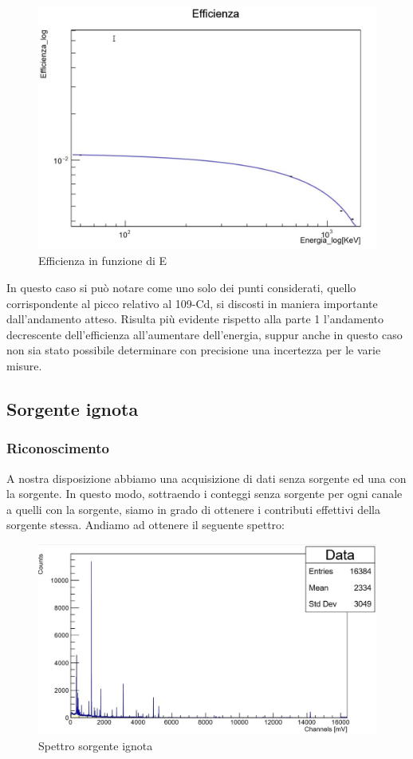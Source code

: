 \documentclass[a4paper,10pt]{article}
\begin{document}
\begin{figure}[H]
    \centering
    \includegraphics[scale=0.45]{grafici/efficienzamultigamma}
    \caption{Efficienza in funzione di E}
\end{figure}

In questo caso si può notare come uno solo dei punti considerati, quello corrispondente al picco relativo al 109-Cd, si discosti in maniera importante dall'andamento atteso. Risulta più evidente rispetto alla parte 1 l'andamento decrescente dell'efficienza all'aumentare dell'energia, suppur anche in questo caso non sia stato possibile determinare con precisione una incertezza per le varie misure.

\subsection{Sorgente ignota}
\subsubsection{Riconoscimento}
A nostra disposizione abbiamo una acquisizione di dati senza sorgente ed una con la sorgente. In questo modo, sottraendo i conteggi senza sorgente per ogni canale a quelli con la sorgente, siamo in grado di ottenere i contributi effettivi della sorgente stessa. Andiamo ad ottenere il seguente spettro:

\begin{figure}[H]
    \centering
    \includegraphics[scale=0.45]{grafici/sorgenteignota}
    \caption{Spettro sorgente ignota}
\end{figure}
\end{document}
